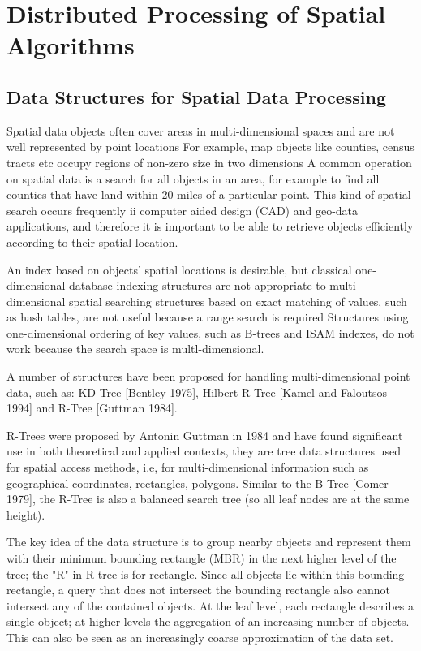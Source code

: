 \section{Distributed Processing of Spatial Algorithms}

\subsection{Data Structures for Spatial Data Processing}

	Spatial data objects often cover areas in multi-dimensional spaces and are not well represented by point locations For example, map objects like counties, census  tracts etc occupy regions of non-zero size  in two dimensions A common operation on spatial data is a search for all objects in an area, for example to find all counties that have land within 20 miles of a particular point. This kind of spatial search occurs frequently ii computer aided design (CAD) and geo-data applications, and therefore it is important to be able to retrieve objects efficiently according to their spatial location. 
	
	An index based on objects' spatial locations is desirable, but classical one-dimensional database indexing structures are not appropriate to multi-dimensional spatial searching structures based on exact matching of values, such as hash tables, are not useful because a range search is required Structures using one-dimensional ordering of key values, such as B-trees and ISAM indexes, do not work because the search space is multl-dimensional. 
		
	A number of structures have been proposed for handling multi-dimensional point data, such as: KD-Tree [Bentley 1975], Hilbert R-Tree [Kamel and Faloutsos 1994] and R-Tree [Guttman 1984].
	
	R-Trees were proposed by Antonin Guttman in 1984 and have found significant use in both theoretical and applied contexts, they are tree data structures used for spatial access methods, i.e, for multi-dimensional information such as geographical coordinates, rectangles, polygons. Similar to the B-Tree [Comer 1979], the R-Tree is also a balanced search tree (so all leaf nodes are at the same height).

	The key idea of the data structure is to group nearby objects and represent them with their minimum bounding rectangle (MBR) in the next higher level of the tree; the "R" in R-tree is for rectangle. Since all objects lie within this bounding rectangle, a query that does not intersect the bounding rectangle also cannot intersect any of the contained objects. At the leaf level, each rectangle describes a single object; at higher levels the aggregation of an increasing number of objects. This can also be seen as an increasingly coarse approximation of the data set.
	
